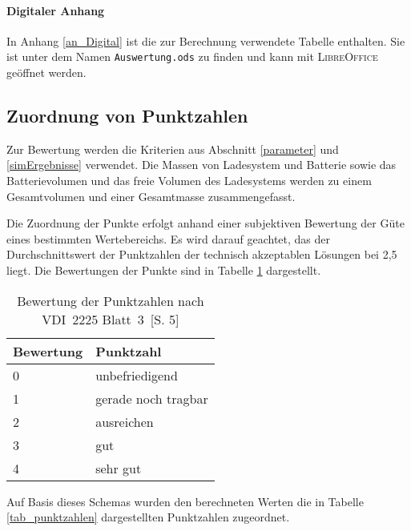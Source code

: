\paragraph{Digitaler Anhang} In Anhang \ref{an_Digital} ist die zur Berechnung verwendete Tabelle enthalten. Sie ist unter dem Namen \texttt{Auswertung.ods} zu finden und kann mit \textsc{LibreOffice} geöffnet werden.

\subsection{Zuordnung von Punktzahlen}
Zur Bewertung werden die Kriterien aus Abschnitt \ref{parameter} und \ref{simErgebnisse} verwendet. Die Massen von Ladesystem und Batterie sowie das Batterievolumen und das freie Volumen des Ladesystems werden zu einem Gesamtvolumen und einer Gesamtmasse zusammengefasst.

Die Zuordnung der Punkte erfolgt anhand einer subjektiven Bewertung der Güte eines bestimmten Wertebereichs. Es wird darauf geachtet, das der Durchschnittswert der Punktzahlen der technisch akzeptablen Lösungen bei 2,5 liegt. Die Bewertungen der Punkte sind in Tabelle \ref{tabPunkte} dargestellt.

\begin{table} \centering
	\begin{tabular}{ll}
		\toprule
		Bewertung & Punktzahl \\ \midrule
		0 & unbefriedigend \\
		1 & gerade noch tragbar \\
		2 & ausreichen \\
		3 & gut \\
		4 & sehr gut \\ \bottomrule
	\end{tabular}
	\caption[Bewertung der Punktzahlen]{Bewertung der Punktzahlen nach VDI~2225 Blatt~3~\cite{vdi:2225}[S. 5]}
	\label{tabPunkte}
\end{table}

Auf Basis dieses Schemas wurden den berechneten Werten die in Tabelle \ref{tab_punktzahlen} dargestellten Punktzahlen zugeordnet.

